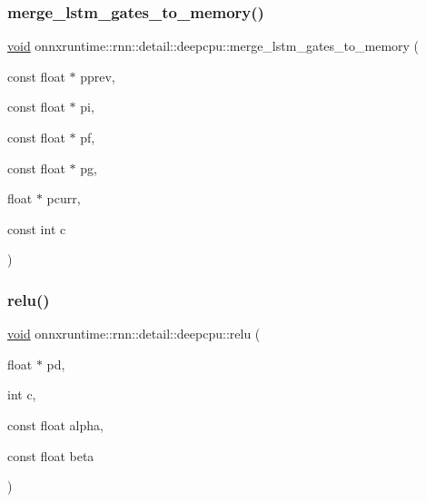 \subsubsection{\texorpdfstring{merge\+\_\+lstm\+\_\+gates\+\_\+to\+\_\+memory()}{merge\_lstm\_gates\_to\_memory()}}
{\footnotesize\ttfamily \mbox{\hyperlink{mlasi_8h_a88f941d423cb2a819b70a1358982b1a6}{void}} onnxruntime\+::rnn\+::detail\+::deepcpu\+::merge\+\_\+lstm\+\_\+gates\+\_\+to\+\_\+memory (\begin{DoxyParamCaption}\item[{const float $\ast$}]{pprev,  }\item[{const float $\ast$}]{pi,  }\item[{const float $\ast$}]{pf,  }\item[{const float $\ast$}]{pg,  }\item[{float $\ast$}]{pcurr,  }\item[{const int}]{c }\end{DoxyParamCaption})}

\mbox{\label{namespaceonnxruntime_1_1rnn_1_1detail_1_1deepcpu_a75ee182dbe346d81dd2f8545ae0db59e}} 
\subsubsection{\texorpdfstring{relu()}{relu()}}
{\footnotesize\ttfamily \mbox{\hyperlink{mlasi_8h_a88f941d423cb2a819b70a1358982b1a6}{void}} onnxruntime\+::rnn\+::detail\+::deepcpu\+::relu (\begin{DoxyParamCaption}\item[{float $\ast$}]{pd,  }\item[{int}]{c,  }\item[{const float}]{alpha,  }\item[{const float}]{beta }\end{DoxyParamCaption})}

\mbox{\label{namespaceonnxruntime_1_1rnn_1_1detail_1_1deepcpu_afdd30b5fdc3181eeac5fe57327468438}} 
